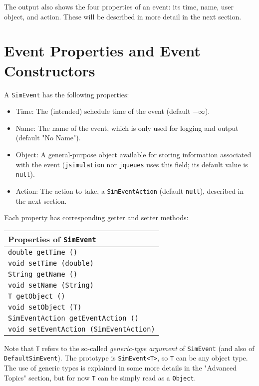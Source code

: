 The output also shows the four properties of an event: its time, name, user object, and action.
These will be described in more detail in the next section.

\section{Event Properties and Event Constructors}

A \lstinline{SimEvent} has the following properties:
\begin{itemize}
\item Time:   The (intended) schedule time of the event (default $-\infty$).
\item Name:   The name of the event, which is only used for logging and output (default "No Name").
\item Object: A general-purpose object available for storing information associated with the event
              (\lstinline{jsimulation} nor \lstinline{jqueues} uses this field; its
              default value is \lstinline{null}).
\item Action: The action to take, a \lstinline{SimEventAction} (default \lstinline{null}),
                described in the next section.
\end{itemize}
Each property has corresponding getter and setter methods:

\begin{tabular}{|l|}
  \hline
  {\bf Properties of \lstinline|SimEvent|} \\
  \hline
  \lstinline[basicstyle=\footnotesize]!double getTime ()! \\
  \lstinline[basicstyle=\footnotesize]!void setTime (double)! \\
  \hline
  \lstinline[basicstyle=\footnotesize]!String getName ()! \\
  \lstinline[basicstyle=\footnotesize]!void setName (String)! \\
  \hline
  \lstinline[basicstyle=\footnotesize]!T getObject ()! \\
  \lstinline[basicstyle=\footnotesize]!void setObject (T)! \\
  \hline
  \lstinline[basicstyle=\footnotesize]!SimEventAction getEventAction ()! \\
  \lstinline[basicstyle=\footnotesize]!void setEventAction (SimEventAction)! \\
  \hline
\end{tabular}

Note that \lstinline{T} refers to the so-called {\em generic-type argument\/}
  of \lstinline{SimEvent} (and also of \lstinline|DefaultSimEvent|).
The prototype is \lstinline|SimEvent<T>|, so \lstinline|T| can be any object type.
The use of generic types is explained in some more details in the "Advanced Topics" section,
  but for now \lstinline!T! can be simply read as a \lstinline{Object}.

